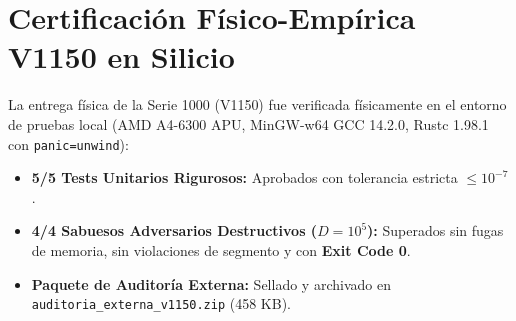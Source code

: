 \section{Certificación Físico-Empírica V1150 en Silicio}
La entrega física de la Serie 1000 (V1150) fue verificada físicamente en el entorno de pruebas local (AMD A4-6300 APU, MinGW-w64 GCC 14.2.0, Rustc 1.98.1 con \texttt{panic=unwind}):
\begin{itemize}
    \item \textbf{5/5 Tests Unitarios Rigurosos:} Aprobados con tolerancia estricta $\le 10^{-7}$.
    \item \textbf{4/4 Sabuesos Adversarios Destructivos ($D = 10^5$):} Superados sin fugas de memoria, sin violaciones de segmento y con \textbf{Exit Code 0}.
    \item \textbf{Paquete de Auditoría Externa:} Sellado y archivado en \texttt{auditoria\_externa\_v1150.zip} (458 KB).
\end{itemize}
